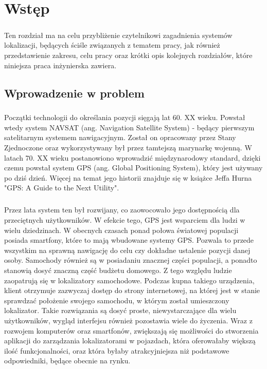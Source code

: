 \chapter{Wstęp}
\label{ch:wstep}
\paragraph{}
Ten rozdział ma na celu przybliżenie czytelnikowi zagadnienia systemów lokalizacji, będących ściśle związanych z tematem pracy, jak również przedstawienie zakresu, celu pracy oraz krótki opis kolejnych rozdziałów, które niniejsza praca inżynierska zawiera.

\section{Wprowadzenie w problem}

\paragraph{}
Początki technologii do określania pozycji sięgają lat 60. XX wieku. Powstał wtedy system NAVSAT (ang. Navigation Satellite System) - będący pierwszym satelitarnym systemem nawigacyjnym. Został on opracowany przez Stany Zjednoczone oraz wykorzystywany był przez tamtejszą marynarkę wojenną. W latach 70. XX wieku postanowiono wprowadzić międzynarodowy standard, dzięki czemu powstał system GPS (ang. Global Positioning System), który jest używany po dziś dzień. Więcej na temat jego historii znajduje się w książce Jeffa Hurna "GPS: A Guide to the Next Utility".

\paragraph{}
Przez lata system ten był rozwijany, co zaowocowało jego dostępnością dla przeciętnych użytkowników. W efekcie tego, GPS jest wsparciem dla ludzi w wielu dziedzinach. W obecnych czasach ponad połowa światowej populacji posiada smartfony, które to mają wbudowane systemy GPS. Pozwala to przede wszystkim na sprawną nawigację do celu czy  dokładne ustalenie pozycji danej osoby. Samochody również są w posiadaniu znacznej części populacji, a ponadto stanowią dosyć znaczną część budżetu domowego. Z tego względu ludzie zaopatrują się w lokalizatory samochodowe. Podczas kupna takiego urządzenia, klient otrzymuje zazwyczaj dostęp do strony internetowej, na której jest w stanie sprawdzać położenie swojego samochodu, w którym został umieszczony lokalizator. Takie rozwiązania są dosyć proste, niewystarczające dla wielu użytkowników, wygląd interfejsu również pozostawia wiele do życzenia. Wraz z rozwojem komputerów oraz smartfonów, zwiększają się możliwości do stworzenia aplikacji do zarządzania lokalizatorami w pojazdach, która oferowałaby większą ilość funkcjonalności, oraz która byłaby atrakcyjniejsza niż podstawowe odpowiedniki, będące obecnie na rynku.

